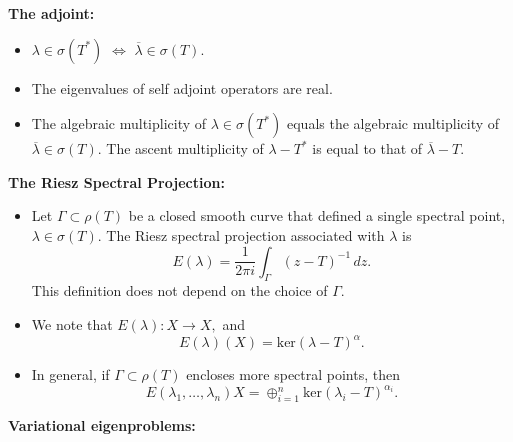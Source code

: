 \documentclass[12pt,a4paper]{article}
\theoremstyle{boldthm}
\theoremstyle{bolddefn}
\begin{document}
\textbf{The adjoint:}
\begin{itemize}
    \item $\lambda \in \sigma(T^*)$ $\iff$ $\overline \lambda \in \sigma(T).$
    \item The eigenvalues of self adjoint operators are real. 
    \item The algebraic multiplicity of $\lambda \in \sigma(T^*)$ equals the algebraic multiplicity of $\overline \lambda \in \sigma(T).$ The ascent multiplicity of $\lambda - T^*$ is equal to that of $\overline \lambda - T.$
\end{itemize}

\textbf{The Riesz Spectral Projection:}

\begin{itemize}
    \item Let $\Gamma \subset \rho(T)$ be a closed smooth curve that defined a single spectral point, $\lambda \in \sigma(T).$ The Riesz spectral projection associated with $\lambda$ is 
    $$ E(\lambda) = \frac{1}{2 \pi i} \int_{\Gamma} (z-T)^{-1} \, dz.$$
    This definition does not depend on the choice of $\Gamma.$
    \item We note that $E(\lambda):X \rightarrow X,$ and $$E(\lambda)(X) = \text{ker}(\lambda - T)^{\alpha}.$$
    \item In general, if $\Gamma \subset \rho(T)$ encloses more spectral points, then 
    $$ E(\lambda_1, \dots, \lambda_n) X = \oplus_{i=1}^{n} \text{ker}(\lambda_i - T)^{\alpha_i}.$$
\end{itemize}


\textbf{Variational eigenproblems:}
\end{document}
